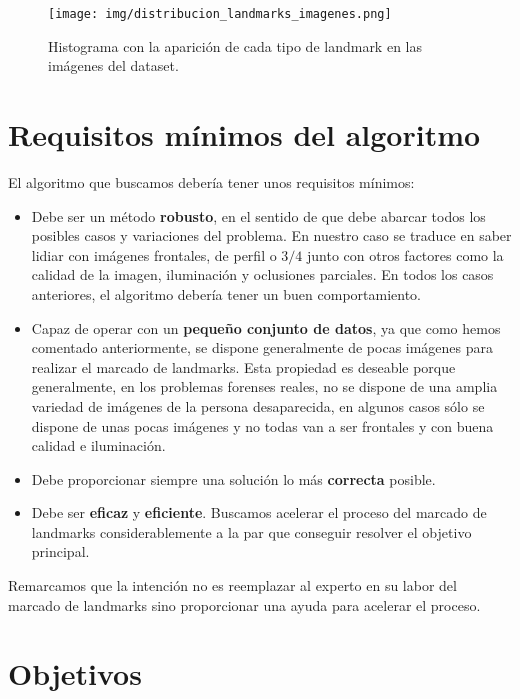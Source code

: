             \begin{figure}[h]
                \centering
                \texttt{[image: img/distribucion\_landmarks\_imagenes.png]}
                \caption{Histograma con la aparición de cada tipo de landmark en las imágenes del dataset.}
                \label{fig:Histograma}
            \end{figure}
    

\section{Requisitos mínimos del algoritmo}

\noindent El algoritmo que buscamos debería tener unos requisitos mínimos: 

\begin{itemize}
    \item Debe ser un método \textbf{robusto}, en el sentido de que debe abarcar todos los posibles casos y variaciones del problema. En nuestro caso se traduce en saber lidiar con imágenes frontales, de perfil o $3/4$ junto con otros factores como la calidad de la imagen, iluminación y oclusiones parciales. En todos los casos anteriores, el algoritmo debería tener un buen comportamiento.
    \item Capaz de operar con un \textbf{pequeño conjunto de datos}, ya que como hemos comentado anteriormente, se dispone generalmente de pocas imágenes para realizar el marcado de landmarks. Esta propiedad es deseable porque generalmente, en los problemas forenses reales, no se dispone de una amplia variedad de imágenes de la persona desaparecida, en algunos casos sólo se dispone de unas pocas imágenes y no todas van a ser frontales y con buena calidad e iluminación.

    \item Debe proporcionar siempre una solución lo más \textbf{correcta} posible.  
    
    \item Debe ser \textbf{eficaz} y \textbf{eficiente}. Buscamos acelerar el proceso del marcado de landmarks considerablemente a la par que conseguir resolver el objetivo principal.
\end{itemize}

\noindent Remarcamos que la intención no es reemplazar al experto en su labor del marcado de landmarks sino proporcionar una ayuda para acelerar el proceso.

\section{Objetivos}

